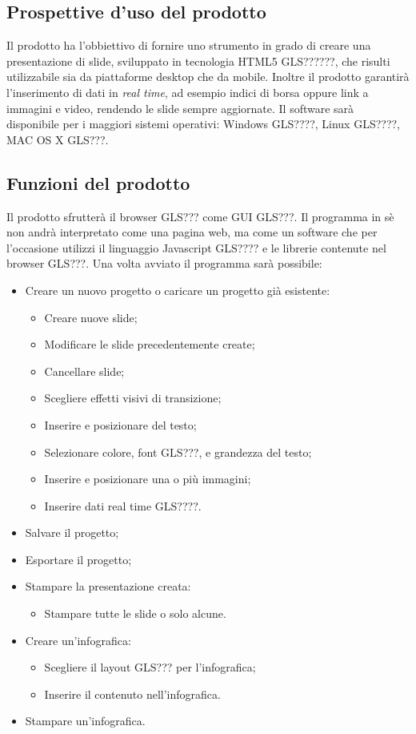 \subsection{Prospettive d'uso del prodotto}
Il prodotto ha l'obbiettivo di fornire uno strumento in grado di creare una presentazione di slide, sviluppato in tecnologia HTML5 GLS??????, che risulti utilizzabile sia da piattaforme desktop che da mobile. Inoltre il prodotto garantirà l'inserimento di dati in \textit{real time}, ad esempio indici di borsa oppure link a immagini e video, rendendo le slide sempre aggiornate. Il software sarà disponibile per i maggiori sistemi operativi: Windows GLS????, Linux GLS????, MAC OS X GLS???.

\subsection{Funzioni del prodotto}
Il prodotto sfrutterà il browser GLS??? come GUI GLS???. Il programma in sè non andrà interpretato come una pagina web, ma come un software che per l'occasione utilizzi il linguaggio Javascript GLS???? e le librerie contenute nel browser GLS???.
Una volta avviato il programma sarà possibile:
\begin{itemize}
	\item Creare un nuovo progetto o caricare un progetto già esistente:
	\begin{itemize}
		\item Creare nuove slide;
		\item Modificare le slide precedentemente create;
		\item Cancellare slide;
		\item Scegliere effetti visivi di transizione;
		\item Inserire e posizionare del testo;
		\item Selezionare colore, font GLS???, e grandezza del testo;
		\item Inserire e posizionare una o più immagini;
		\item Inserire dati real time GLS????.
	\end{itemize}
	\item Salvare il progetto;
	\item Esportare il progetto;
	\item Stampare la presentazione creata:
	\begin{itemize}
		\item Stampare tutte le slide o solo alcune.
	\end{itemize}
	\item Creare un'infografica:
	\begin{itemize}
		\item Scegliere il layout GLS??? per l'infografica;
		\item Inserire il contenuto nell'infografica.
	\end{itemize}
	\item Stampare un'infografica.
\end{itemize}

